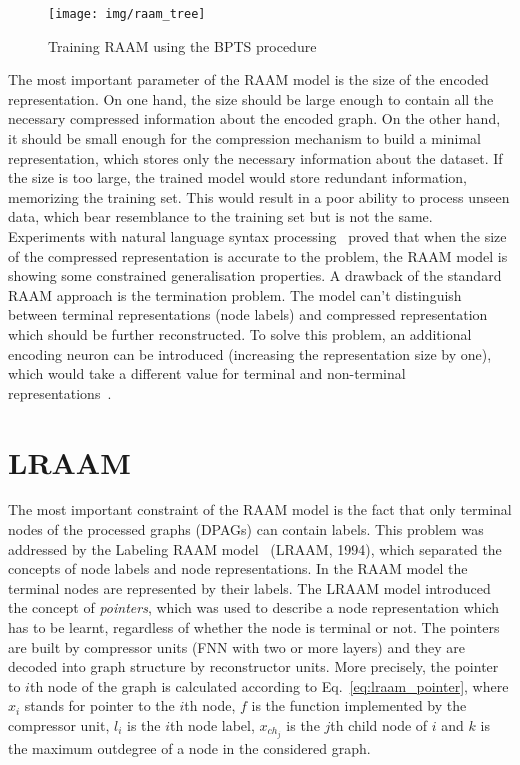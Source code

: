 \begin{figure}
\begin{center}
	\texttt{[image: img/raam\_tree]}
	\caption{Training RAAM using the BPTS procedure}
	\label{fig:raam_tree}
\end{center}
\end{figure}

The most important parameter of the RAAM model is the size of the encoded representation. On one hand, the size should be large enough to contain all the necessary compressed information about the encoded graph. On the other hand, it should be small enough for the compression mechanism to build a minimal representation, which stores only the necessary information about the dataset. If the size is too large, the trained model would store redundant information, memorizing the training set. This would result in a poor ability to process unseen data, which bear resemblance to the training set but is not the same. Experiments with natural language syntax processing~\cite{pollack1990recursive} proved that when the size of the compressed representation is accurate to the problem, the RAAM model is showing some constrained generalisation properties. A drawback of the standard RAAM approach is the termination problem. The model can't distinguish between terminal representations (node labels) and compressed representation which should be further reconstructed. To solve this problem, an additional encoding neuron can be introduced (increasing the representation size by one), which would take a different value for terminal and non-terminal representations~\cite{stolcke1992tree}.

\section{LRAAM}
The most important constraint of the RAAM model is the fact that only terminal nodes of the processed graphs (DPAGs) can contain labels. This problem was addressed by the Labeling RAAM model~\cite{sperduti1994labelling} (LRAAM, 1994), which separated the concepts of node labels and node representations. In the RAAM model the terminal nodes are represented by their labels. The LRAAM model introduced the concept of \emph{pointers}, which was used to describe a node representation which has to be learnt, regardless of whether the node is terminal or not. The pointers are built by compressor units (FNN with two or more layers) and they are decoded into graph structure by reconstructor units. More precisely, the pointer to $i$th node of the graph is calculated according to Eq.~\ref{eq:lraam_pointer}, where $x_i$ stands for pointer to the $i$th node, $f$ is the function implemented by the compressor unit, $l_i$ is the $i$th node label, $x_{ch_j}$ is the $j$th child node of $i$ and $k$ is the maximum outdegree of a node in the considered graph.

